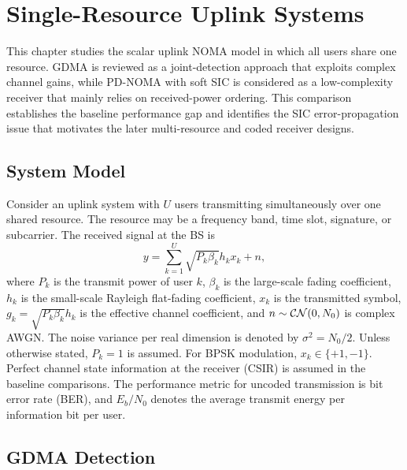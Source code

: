 \chapter{Single-Resource Uplink Systems}\label{ch:single-resource}

This chapter studies the scalar uplink NOMA model in which all users share one resource. GDMA is reviewed as a joint-detection approach that exploits complex channel gains, while PD-NOMA with soft SIC is considered as a low-complexity receiver that mainly relies on received-power ordering. This comparison establishes the baseline performance gap and identifies the SIC error-propagation issue that motivates the later multi-resource and coded receiver designs.

\section{System Model}

Consider an uplink system with $U$ users transmitting simultaneously over one shared resource. The resource may be a frequency band, time slot, signature, or subcarrier. The received signal at the BS is
\begin{equation}
    \label{eq:single_resource_system_model}
    y = \sum_{k=1}^{U} \sqrt{P_k \beta_k} h_k x_k + n,
\end{equation}
where $P_k$ is the transmit power of user $k$, $\beta_k$ is the large-scale fading coefficient, $h_k$ is the small-scale Rayleigh flat-fading coefficient, $x_k$ is the transmitted symbol, $g_k=\sqrt{P_k\beta_k}h_k$ is the effective channel coefficient, and $n\sim\mathcal{CN}(0,N_0)$ is complex AWGN. The noise variance per real dimension is denoted by $\sigma^2=N_0/2$. Unless otherwise stated, $P_k=1$ is assumed.
For BPSK modulation, $x_k\in\{+1,-1\}$. Perfect channel state information at the receiver (CSIR) is assumed in the baseline comparisons. The performance metric for uncoded transmission is bit error rate (BER), and $E_b/N_0$ denotes the average transmit energy per information bit per user.


\section{GDMA Detection}

